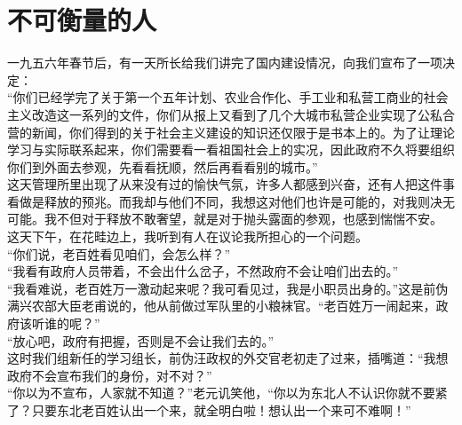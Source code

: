 \fancyhead[RO]{\thepage} %
\fancyhead[LE]{\thepage} %
\chapter*{不可衡量的人}
一九五六年春节后，有一天所长给我们讲完了国内建设情况，向我们宣布了一项决定：\\

“你们已经学完了关于第一个五年计划、农业合作化、手工业和私营工商业的社会主义改造这一系列的文件，你们从报上又看到了几个大城市私营企业实现了公私合营的新闻，你们得到的关于社会主义建设的知识还仅限于是书本上的。为了让理论学习与实际联系起来，你们需要看一看祖国社会上的实况，因此政府不久将要组织你们到外面去参观，先看看抚顺，然后再看看别的城市。”\\

这天管理所里出现了从来没有过的愉快气氛，许多人都感到兴奋，还有人把这件事看做是释放的预兆。而我却与他们不同，我想这对他们也许是可能的，对我则决无可能。我不但对于释放不敢奢望，就是对于抛头露面的参观，也感到惴惴不安。\\

这天下午，在花畦边上，我听到有人在议论我所担心的一个问题。\\

“你们说，老百姓看见咱们，会怎么样？”\\

“我看有政府人员带着，不会出什么岔子，不然政府不会让咱们出去的。”\\

“我看难说，老百姓万一激动起来呢？我可看见过，我是小职员出身的。”这是前伪满兴农部大臣老甫说的，他从前做过军队里的小粮袜官。“老百姓万一闹起来，政府该听谁的呢？”\\

“放心吧，政府有把握，否则是不会让我们去的。”\\

这时我们组新任的学习组长，前伪汪政权的外交官老初走了过来，插嘴道：“我想政府不会宣布我们的身份，对不对？”\\

“你以为不宣布，人家就不知道？”老元讥笑他，“你以为东北人不认识你就不要紧了？只要东北老百姓认出一个来，就全明白啦！想认出一个来可不难啊！”\\

